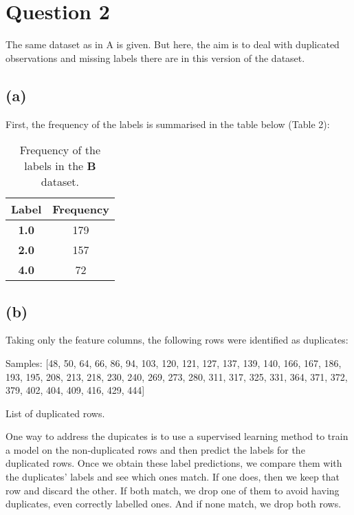 \documentclass[12pt]{report} %
\begin{document}
\section*{Question 2}

The same dataset as in A is given. But here, the aim is to deal with duplicated observations and missing labels there are in this version of the dataset.

\subsection*{(a)}

First, the frequency of the labels is summarised in the table below (Table 2):

\begin{table}[h]
\centering
\begin{tabular}{ |c|c| }
    \hline
    \textbf{Label} & \textbf{Frequency} \\
    \hline
    \textbf{1.0} & 179 \\ 
    \hline
    \textbf{2.0} & 157 \\
    \hline
    \textbf{4.0} & 72 \\
    \hline
\end{tabular}
\caption{Frequency of the labels in the \textbf{B} dataset.}
\end{table}

\subsection*{(b)}

Taking only the feature columns, the following rows were identified as duplicates:

\begin{table}[h]
\centering
Samples: [48, 50, 64, 66, 86, 94, 103, 120, 121, 127, 137, 139, 140, 166, 167, 186, 193, 195,
208, 213, 218, 230, 240, 269, 273, 280, 311, 317, 325, 331, 364, 371, 372, 379, 402, 404,
409, 416, 429, 444]

\caption{List of duplicated rows.}
\end{table}

One way to address the dupicates is to use a supervised learning method to train a model on the non-duplicated rows and then predict the labels for the duplicated rows. Once we obtain these label predictions, we compare them with the duplicates' labels and see which ones match. If one does, then we keep that row and discard the other. If both match, we drop one of them to avoid having duplicates, even correctly labelled ones. And if none match, we drop both rows.
\end{document}
